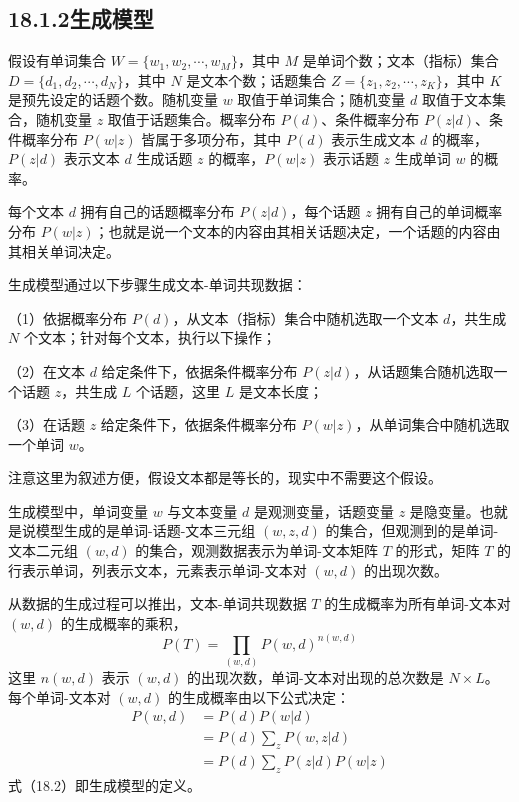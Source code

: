 \documentclass[UTF8, 12pt, fontset=fandol, oneside]{ctexart}
\begin{document}
\subsection*{18.1.2\quad 生成模型}

假设有单词集合 $W=\{w_1,w_2,\cdots,w_M\}$，其中 $M$ 是单词个数；文本（指标）集合 $D=\{d_1,d_2,\cdots,d_N\}$，其中 $N$ 是文本个数；话题集合 $Z=\{z_1,z_2,\cdots,z_K\}$，其中 $K$ 是预先设定的话题个数。随机变量 $w$ 取值于单词集合；随机变量 $d$ 取值于文本集合，随机变量 $z$ 取值于话题集合。概率分布 $P(d)$、条件概率分布 $P(z|d)$、条件概率分布 $P(w|z)$ 皆属于多项分布，其中 $P(d)$ 表示生成文本 $d$ 的概率，$P(z|d)$ 表示文本 $d$ 生成话题 $z$ 的概率，$P(w|z)$ 表示话题 $z$ 生成单词 $w$ 的概率。

每个文本 $d$ 拥有自己的话题概率分布 $P(z|d)$，每个话题 $z$ 拥有自己的单词概率分布 $P(w|z)$；也就是说一个文本的内容由其相关话题决定，一个话题的内容由其相关单词决定。

生成模型通过以下步骤生成文本-单词共现数据：

（1）依据概率分布 $P(d)$，从文本（指标）集合中随机选取一个文本 $d$，共生成 $N$ 个文本；针对每个文本，执行以下操作；

（2）在文本 $d$ 给定条件下，依据条件概率分布 $P(z|d)$，从话题集合随机选取一个话题 $z$，共生成 $L$ 个话题，这里 $L$ 是文本长度；

（3）在话题 $z$ 给定条件下，依据条件概率分布 $P(w|z)$，从单词集合中随机选取一个单词 $w$。

注意这里为叙述方便，假设文本都是等长的，现实中不需要这个假设。

生成模型中，单词变量 $w$ 与文本变量 $d$ 是观测变量，话题变量 $z$ 是隐变量。也就是说模型生成的是单词-话题-文本三元组 $(w,z,d)$ 的集合，但观测到的是单词-文本二元组 $(w,d)$ 的集合，观测数据表示为单词-文本矩阵 $T$ 的形式，矩阵 $T$ 的行表示单词，列表示文本，元素表示单词-文本对 $(w,d)$ 的出现次数。

从数据的生成过程可以推出，文本-单词共现数据 $T$ 的生成概率为所有单词-文本对 $(w,d)$ 的生成概率的乘积，
\begin{equation}
P(T)=\prod_{(w,d)}P(w,d)^{n(w,d)}
\tag{18.1}
\end{equation}
这里 $n(w,d)$ 表示 $(w,d)$ 的出现次数，单词-文本对出现的总次数是 $N\times L$。每个单词-文本对 $(w,d)$ 的生成概率由以下公式决定：
\begin{equation}
\begin{aligned}
P(w,d)&=P(d)P(w|d)\\
&=P(d)\sum_z P(w,z|d)\\
&=P(d)\sum_z P(z|d)P(w|z)
\end{aligned}
\tag{18.2}
\end{equation}
式（18.2）即生成模型的定义。
\end{document}

